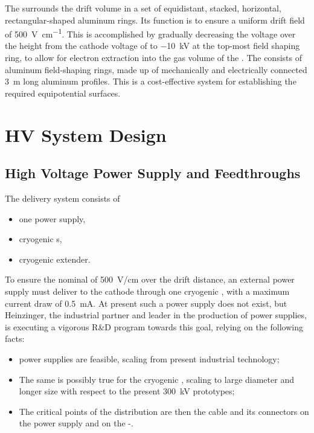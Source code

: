 The  surrounds the drift volume in a set of equidistant, stacked, horizontal, rectangular-shaped aluminum rings. Its function is to ensure a uniform drift field of \SI{500}{\V\per\cm}. This is accomplished by gradually decreasing the voltage over the \tpcheight height from the cathode voltage of \dptargetdriftvoltneg to \SI{-10}{\kV} at the top-most field shaping ring, to allow for electron extraction into the gas volume of the . The  consists of aluminum field-shaping rings, made up of mechanically and electrically connected \SI{3}{m} long aluminum profiles. This is a cost-effective system for establishing the required equipotential surfaces. 

\section{HV System Design}
\label{sec:fddp-hv-design}

\subsection {High Voltage Power Supply and Feedthroughs}
The  delivery system consists of
\begin{itemize}
\item one power supply,
\item {} cryogenic \fdth{}s,
\item {} cryogenic extender.
\end{itemize}

To ensure the nominal \efield of \SI{500}{V/cm} over  the \dpmaxdrift drift distance, an external power supply must deliver \dptargetdriftvoltneg to  the cathode through one  cryogenic \fdth, with a maximum current draw of \SI{0.5}{\milli\ampere}.
At present such a power supply does not exist, but  Heinzinger, the industrial partner and leader in the production of  power supplies, is executing a vigorous R\&D program towards this goal, relying on the following facts:

\begin{itemize}
\item \dptargetdriftvoltpos power supplies are feasible, scaling from present industrial technology;
\item The same is possibly true for the  cryogenic \fdth, scaling to large diameter and longer size with respect to the present \SI{300}{\kV} prototypes;
\item The critical points of the  distribution are then the cable and its connectors on the power supply and on the -\fdth. 
\end{itemize}

